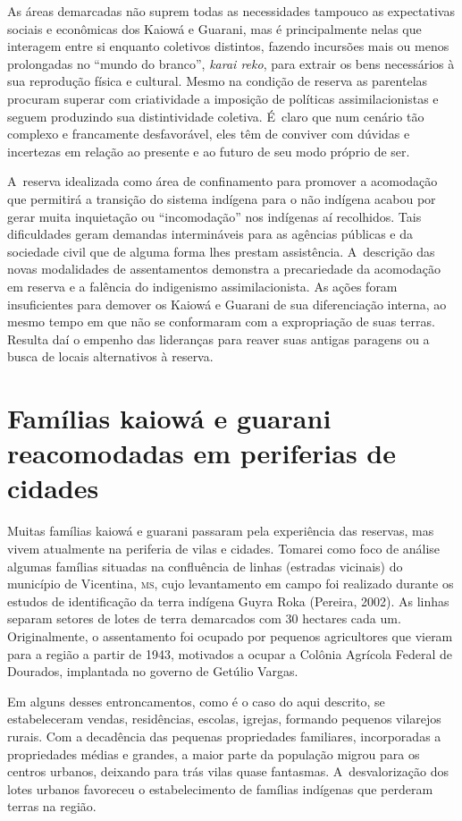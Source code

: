 As áreas demarcadas não suprem todas as necessidades tampouco as
expectativas sociais e econômicas dos Kaiowá e Guarani, mas é
principalmente nelas que interagem entre si enquanto coletivos
distintos, fazendo incursões mais ou menos prolongadas no ``mundo do
branco'', \emph{karai reko}, para extrair os bens necessários à sua reprodução
física e cultural. Mesmo na condição de reserva as parentelas procuram
superar com criatividade a imposição de políticas assimilacionistas e
seguem produzindo sua distintividade coletiva. É~claro que num cenário
tão complexo e francamente desfavorável, eles têm de conviver com
dúvidas e incertezas em relação ao presente e ao futuro de seu modo
próprio de ser. 

A~reserva idealizada como área de confinamento para promover a
acomodação que permitirá a transição do sistema indígena para o não
indígena acabou por gerar muita inquietação ou ``incomodação'' nos
indígenas aí recolhidos. Tais dificuldades geram demandas intermináveis
para as agências públicas e da sociedade civil que de alguma forma lhes
prestam assistência. A~descrição das novas modalidades de assentamentos
demonstra a precariedade da acomodação em reserva e a falência do
indigenismo assimilacionista. As ações foram insuficientes para demover
os Kaiowá e Guarani de sua diferenciação interna, ao mesmo tempo em que
não se conformaram com a expropriação de suas terras. Resulta daí o
empenho das lideranças para reaver suas antigas paragens ou a busca de
locais alternativos à reserva.

\section{Famílias kaiowá e guarani reacomodadas em periferias de cidades}

Muitas famílias kaiowá e guarani passaram pela experiência das reservas,
mas vivem atualmente na periferia de vilas e cidades. Tomarei como foco
de análise algumas famílias situadas na confluência de linhas (estradas
vicinais) do município de Vicentina, \textsc{ms}, cujo levantamento em campo foi
realizado durante os estudos de identificação da terra indígena Guyra
Roka (Pereira, 2002). As linhas separam setores de lotes de terra
demarcados com 30 hectares cada um. Originalmente, o assentamento foi
ocupado por pequenos agricultores que vieram para a região a partir de
1943, motivados a ocupar a Colônia Agrícola Federal de Dourados,
implantada no governo de Getúlio Vargas.

Em alguns desses entroncamentos, como é o caso do aqui descrito, se
estabeleceram vendas, residências, escolas, igrejas, formando pequenos
vilarejos rurais. Com a decadência das pequenas propriedades
familiares, incorporadas a propriedades médias e grandes, a maior parte
da população migrou para os centros urbanos, deixando para trás vilas
quase fantasmas. A~desvalorização dos lotes urbanos favoreceu o
estabelecimento de famílias indígenas que perderam terras na região.

